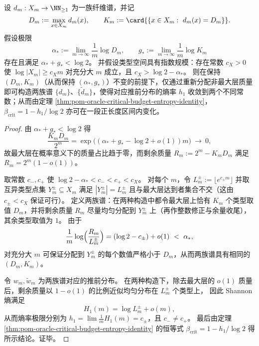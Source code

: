 \begin{corollary}\label{cor:pom-extremes-do-not-determine-beta-crit}
设 \(d_m:X_m\to\NN_{\ge 1}\) 为一族纤维谱，并记
\[
D_m:=\max_{x\in X_m}d_m(x),\qquad
K_m:=\card{\{x\in X_m:\ d_m(x)=D_m\}}.
\]
假设极限
\[
\alpha_*:=\lim_{m\to\infty}\frac{1}{m}\log D_m,\qquad
g_*:=\lim_{m\to\infty}\frac{1}{m}\log K_m
\]
存在且满足 \(\alpha_*+g_*<\log2\)。
并假设类型空间具有指数规模：存在常数 \(c_X>0\) 使 \(\log|X_m|\ge c_X m\) 对充分大 \(m\) 成立，且 \(c_X>\log2-\alpha_*\)。
则在保持 \((D_m,K_m)\)（从而保持 \((\alpha_*,g_*)\)）不变的前提下，仅通过重新分配非最大层质量即可构造两族谱 \(\{d_m\}\)、\(\{\tilde d_m\}\)，使得对应推前分布的熵率 \(h_1\) 收敛到两个不同常数；从而由定理 \ref{thm:pom-oracle-critical-budget-entropy-identity}，\(\beta_{\mathrm{crit}}=1-h_1/\log2\) 亦可在一段正长度区间内变化。
\end{corollary}
\begin{proof}
由 \(\alpha_*+g_*<\log2\) 得
\[
\frac{K_mD_m}{2^m}=\exp\!\bigl((\alpha_*+g_*-\log2+o(1))m\bigr)\ \longrightarrow\ 0,
\]
故最大层在概率意义下的质量占比趋于零，而剩余质量
\(
R_m:=2^m-K_mD_m
\)
满足 \(R_m=2^m(1-o(1))\)。
\par
取常数 \(c_-,c_+\) 使 \(\log2-\alpha_*<c_-<c_+<c_X\)。
对每个 \(m\)，令 \(L_m^\pm:=\lfloor e^{c_\pm m}\rfloor\) 并取互异类型点集 \(Y_m^\pm\subseteq X_m\) 满足 \(|Y_m^\pm|=L_m^\pm\) 且与最大层达到者集合不交（这由 \(c_\pm<c_X\) 保证可行）。
定义两族谱：在两种构造中都令最大层上恰有 \(K_m\) 个类型取值 \(D_m\)，并将剩余质量 \(R_m\) 尽量均匀分配到 \(Y_m^\pm\) 上（再作整数修正与余量收尾），其余类型取值为 \(1\)。
由于
\[
\frac{1}{m}\log\Bigl(\frac{R_m}{L_m^\pm}\Bigr)
=(\log2-c_\pm)+o(1)\ <\ \alpha_*,
\]
对充分大 \(m\) 可保证分配到 \(Y_m^\pm\) 的每个数值严格小于 \(D_m\)，从而两族谱具有相同的 \((D_m,K_m)\)。
\par
令 \(w_m,\tilde w_m\) 为两族谱对应的推前分布。
在两种构造下，除去最大层的 \(o(1)\) 质量后，剩余质量以 \(1-o(1)\) 的比例近似均匀分布在 \(L_m^\pm\) 个类型上，
因此 Shannon 熵满足
\[
H_1(m)=\log L_m^\pm+o(m),
\]
从而熵率极限分别为
\(
h_1=\lim\frac1m H_1(m)=c_\pm
\)，且 \(c_-\ne c_+\)。
最后由定理 \ref{thm:pom-oracle-critical-budget-entropy-identity} 的恒等式 \(\beta_{\mathrm{crit}}=1-h_1/\log2\) 得所示结论。证毕。
\end{proof}

